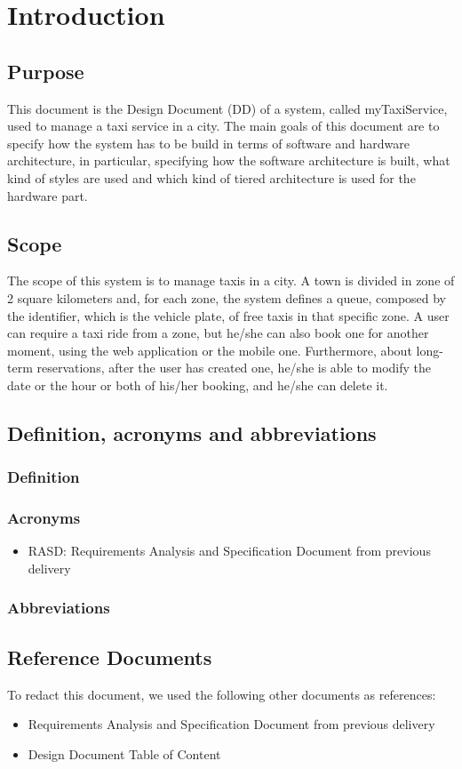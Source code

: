 \section{Introduction}
\subsection{Purpose}
	This document is the Design Document (DD) of a system, called myTaxiService, used to manage  a taxi service in a city. The main goals of this document are to specify how the system has to be build in terms of software and hardware architecture, in particular, specifying how the software architecture is built, what kind of styles are used and which kind of tiered architecture is used for the hardware part.
\subsection{Scope}
	The scope of this system is to manage taxis in a city. A town is divided in zone of 2 square kilometers and, for each zone, the system defines a queue, composed by the identifier, which is the vehicle plate, of free taxis in that specific zone. A user can require a taxi ride from a zone, but he/she can also book one for another moment, using the web application or the mobile one. Furthermore, about long-term reservations, after the user has created one, he/she is able to modify the date or the hour or both of his/her booking, and he/she can delete it. 
\subsection{Definition, acronyms and abbreviations}
	\subsubsection{Definition}
	\subsubsection{Acronyms}
		 \begin{itemize}
		 	\item RASD: Requirements Analysis and Specification Document from previous delivery
		 \end{itemize}
	\subsubsection{Abbreviations}
\subsection{Reference Documents}
	To redact this document, we used the following other documents as references:
	\begin{itemize}
		\item Requirements Analysis and Specification Document from previous delivery
		\item Design Document Table of Content 
	\end{itemize}
